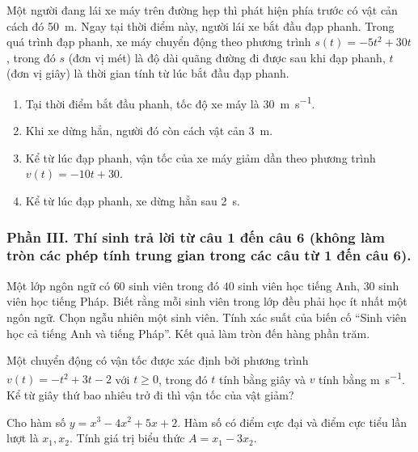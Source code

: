 \begin{baitap} %
	Một người đang lái xe máy trên đường hẹp thì phát hiện phía trước có vật cản cách đó \SI{50}{\meter}. Ngay tại thời điểm này, người lái xe bắt đầu đạp phanh. Trong quá trình đạp phanh, xe máy chuyển động theo phương trình $s(t)=-5t^2+30t$, trong đó $s$ (đơn vị mét) là độ dài quãng đường đi được sau khi đạp phanh, $t$ (đơn vị giây) là thời gian tính từ lúc bắt đầu đạp phanh.
	\begin{enumerate}[\quad \bf a)]
		\item Tại thời điểm bắt đầu phanh, tốc độ xe máy là \SI{30}{\meter\per\second}.
		\item Khi xe dừng hẳn, người đó còn cách vật cản \SI{3}{\meter}.
		\item Kể từ lúc đạp phanh, vận tốc của xe máy giảm dần theo phương trình $v(t)=-10t+30$.
		\item Kể từ lúc đạp phanh, xe dừng hẳn sau \SI{2}{\second}.
	\end{enumerate}
\end{baitap}


\subsubsection*{Phần III. Thí sinh trả lời từ câu 1 đến câu 6 (không làm tròn các phép tính trung gian trong các câu từ 1 đến câu 6).}
\setcounter{bt}{0}
\begin{baitap}%
	Một lớp ngôn ngữ có $60$ sinh viên trong đó $40$ sinh viên học tiếng Anh, $30$ sinh viên học tiếng Pháp. Biết rằng mỗi sinh viên trong lớp đều phải học ít nhất một ngôn ngữ. Chọn ngẫu nhiên một sinh viên. Tính xác suất của biến cố ``Sinh viên học cả tiếng Anh và tiếng Pháp''. Kết quả làm tròn đến hàng phần trăm.
\end{baitap}

\begin{baitap}%
	Một chuyển động có vận tốc được xác định bởi phương trình $v(t)=-t^2+3t-2$ với $t \ge 0$, trong đó $t$ tính bằng giây và $v$ tính bằng \si{\meter\per\second}. Kể từ giây thứ bao nhiêu trở đi thì vận tốc của vật giảm?
\end{baitap}

\begin{baitap}%
	Cho hàm số $y=x^3-4x^2+5x+2$. Hàm số có điểm cực đại và điểm cực tiểu lần lượt là $x_1, x_2$. Tính giá trị biểu thức $A=x_1-3x_2$.
\end{baitap}

